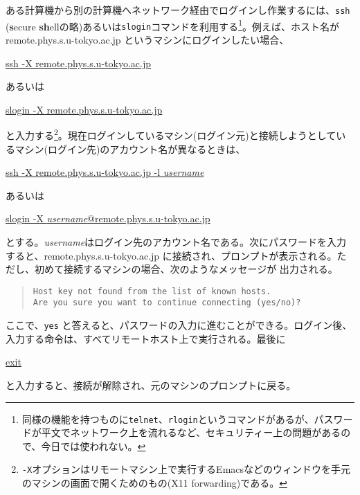 ある計算機から別の計算機へネットワーク経由でログインし作業するには、{\tt ssh} ({\bf s}ecure {\bf sh}ellの略)あるいは{\tt slogin}コマンドを利用する\footnote{同様の機能を持つものに{\tt telnet}、{\tt rlogin}というコマンドがあるが、パスワードが平文でネットワーク上を流れるなど、セキュリティー上の問題があるので、今日では使われない。}。例えば、ホスト名が remote.phys.s.u-tokyo.ac.jp というマシンにログインしたい場合、
\begin{commandline2}
\prompt \underline{ssh -X remote.phys.s.u-tokyo.ac.jp}
\end{commandline2} \noindent
あるいは
\begin{commandline2}
\prompt \underline{slogin -X remote.phys.s.u-tokyo.ac.jp}
\end{commandline2} \noindent
と入力する\footnote{{\tt -X}オプションはリモートマシン上で実行するEmacsなどのウィンドウを手元のマシンの画面で開くためのもの(X11 forwarding)である。}。現在ログインしているマシン(ログイン元)と接続しようとしているマシン(ログイン先)のアカウント名が異なるときは、
\begin{commandline2}
\prompt \underline{ssh -X remote.phys.s.u-tokyo.ac.jp -l {\it username}}
\end{commandline2} \noindent
あるいは
\begin{commandline2}
\prompt \underline{slogin -X {\it username}@remote.phys.s.u-tokyo.ac.jp}
\end{commandline2} \noindent
とする。{\it username}はログイン先のアカウント名である。次にパスワードを入力すると、remote.phys.s.u-tokyo.ac.jp に接続され、プロンプトが表示される。ただし、初めて接続するマシンの場合、次のようなメッセージが
出力される。
\begin{quote}
\begin{verbatim}
Host key not found from the list of known hosts.
Are you sure you want to continue connecting (yes/no)?
\end{verbatim}
\end{quote}
ここで、{\tt yes} と答えると、パスワードの入力に進むことができる。ログイン後、入力する命令は、すべてリモートホスト上で実行される。最後に 
\begin{commandline2}
\prompt \underline{exit}
\end{commandline2} \noindent
と入力すると、接続が解除され、元のマシンのプロンプトに戻る。

